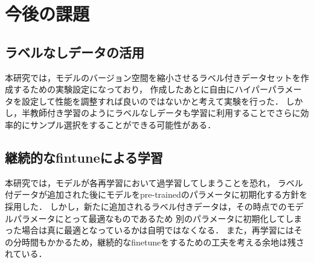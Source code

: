 \section{今後の課題}

\subsection{ラベルなしデータの活用}
本研究では，モデルのバージョン空間を縮小させるラベル付きデータセットを作成するための実験設定になっており，
作成したあとに自由にハイパーパラメータを設定して性能を調整すれば良いのではないかと考えて実験を行った．
しかし，半教師付き学習のようにラベルなしデータも学習に利用することでさらに効率的にサンプル選択をすることができる可能性がある．

\subsection{継続的なfintuneによる学習}
本研究では，モデルが各再学習において過学習してしまうことを恐れ，
ラベル付データが追加された後にモデルをpre-trainedのパラメータに初期化する方針を採用した．
しかし，新たに追加されるラベル付きデータは，その時点でのモデルパラメータにとって最適なものであるため
別のパラメータに初期化してしまった場合は真に最適となっているかは自明ではなくなる．
また，再学習にはその分時間もかかるため，継続的なfinetuneをするための工夫を考える余地は残されている．
